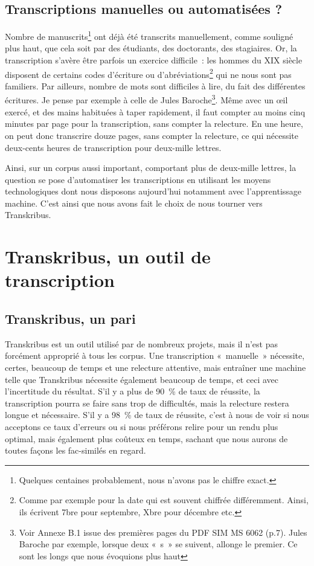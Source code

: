 \subsection{Transcriptions manuelles ou automatisées ?}
	
Nombre de manuscrits\footnote{Quelques centaines probablement, nous n'avons pas le chiffre exact.} ont déjà été transcrits manuellement, comme souligné plus haut, que cela soit par des étudiants, des doctorants, des stagiaires.
Or, la transcription s’avère être parfois un exercice difficile : les hommes du XIX siècle disposent de certains codes d’écriture ou d’abréviations\footnote{Comme par exemple pour la date qui est souvent chiffrée différemment. Ainsi, ils écrivent 7bre pour septembre, Xbre pour décembre etc.} qui ne nous sont pas familiers. Par ailleurs, nombre de mots sont difficiles à lire, du fait des différentes écritures. Je pense par exemple à celle de Jules Baroche\footnote{Voir Annexe B.1 issue des premières pages du PDF SIM MS 6062 (p.7). Jules Baroche par exemple, lorsque deux « s » se suivent, allonge le premier. Ce sont les  longs que nous évoquions plus haut}.
Même avec un œil exercé, et des mains habituées à taper rapidement, il faut compter au moins cinq minutes par page pour la transcription, sans compter la relecture. En une heure, on peut donc transcrire douze pages, sans compter la relecture, ce qui nécessite deux-cents heures de transcription pour deux-mille lettres.

Ainsi, sur un corpus aussi important, comportant plus de deux-mille lettres, la question se pose d’automatiser les transcriptions en utilisant les moyens technologiques dont nous disposons aujourd’hui notamment avec l’apprentissage machine. C’est ainsi que nous avons fait le choix de nous tourner vers Transkribus.


\section{Transkribus, un outil de transcription}

\subsection{Transkribus, un pari}

Transkribus est un outil utilisé par de nombreux projets, mais il n’est pas forcément approprié à tous les corpus. Une transcription « manuelle » nécessite, certes, beaucoup de temps et une relecture attentive, mais entraîner une machine telle que Transkribus nécessite également beaucoup de temps, et ceci avec l’incertitude du résultat. 
S’il y a plus de 90 \% de taux de réussite, la transcription pourra se faire sans trop de difficultés, mais la relecture restera longue et nécessaire. S’il y a 98 \% de taux de réussite, c’est à nous de voir si nous acceptons ce taux d’erreurs ou si nous préférons relire pour un rendu plus optimal, mais également plus coûteux en temps, sachant que nous aurons de toutes façons les fac-similés en regard.

